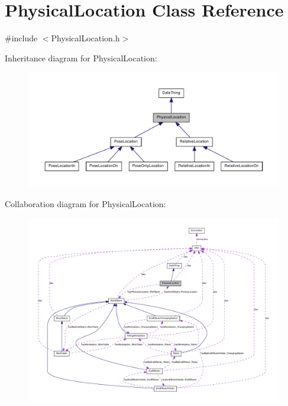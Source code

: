 \hypertarget{class_physical_location}{
\section{PhysicalLocation Class Reference}
\label{class_physical_location}
}


{\ttfamily \#include $<$PhysicalLocation.h$>$}



Inheritance diagram for PhysicalLocation:\nopagebreak
\begin{figure}[H]
\begin{center}
\leavevmode
\includegraphics[width=400pt]{class_physical_location__inherit__graph}
\end{center}
\end{figure}


Collaboration diagram for PhysicalLocation:\nopagebreak
\begin{figure}[H]
\begin{center}
\leavevmode
\includegraphics[width=400pt]{class_physical_location__coll__graph}
\end{center}
\end{figure}
